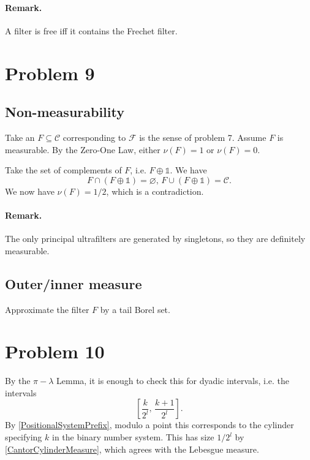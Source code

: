\paragraph{Remark.} A filter is free iff it contains the Frechet filter.

\section*{Problem 9}

\subsection*{Non-measurability}

Take an \( F \subseteq  \mathcal{C} \) corresponding to \( \mathcal{F} \) is the sense of problem 7. Assume \( F \) is measurable. By the Zero-One Law, either \( \nu( F ) = 1 \) or \( \nu( F ) = 0 \).

Take the set of complements of \( F \), i.e. \( F \oplus \mathbb{1} \). We have
\[ 
    F \cap (F \oplus \mathbb{1}) = \varnothing,\, F \cup (F \oplus \mathbb{1}) = \mathcal{C}.
\]
We now have \( \nu(F) = 1/2 \), which is a contradiction.

\paragraph{Remark.} The only principal ultrafilters are generated by singletons, so they are definitely measurable.

\subsection*{Outer/inner measure}

Approximate the filter \( F \) by a tail Borel set.

\section*{Problem 10}

By the \( \pi-\lambda \) Lemma, it is enough to check this for dyadic intervals, i.e. the intervals
\[ 
    \left[ \frac{k}{2^l},\, \frac{k+1}{2^l} \right].
\]
By \ref{PositionalSystemPrefix}, modulo a point this corresponds to the cylinder specifying \( k \) in the binary number system. This has size \( 1/2^l \) by \ref{CantorCylinderMeasure}, which agrees with the Lebesgue measure.

